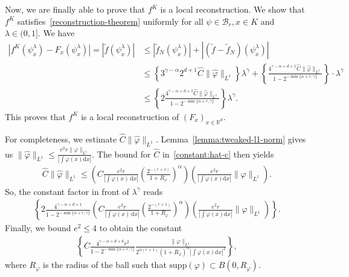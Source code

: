 Now, we are finally able to prove that \(f^K\) is a local reconstruction. We show that \(f^K\) satisfies~\eqref{reconstruction-theorem} uniformly for all \(\psi \in \mathcal{B}_r, x \in K\) and \(\lambda \in (0,1]\). We have
\begin{align*}
    |f^K(\psi^\lambda_x) - F_x(\psi^\lambda_x)| = |\tilde f (\psi^\lambda_x)| 
    &\leq  |\tilde f_N (\psi^\lambda_x)| + |(\tilde f - \tilde f_N) (\psi^\lambda_x)| \\
    &\leq \left \{ 3^{\gamma - \alpha} 2^{d+1} \hat C  \lVert \hat \varphi\rVert_{L^1} \right \} \lambda^\gamma +  \left\{ \frac{ 4^{\gamma - \alpha + d + 1} \hat C \lVert \hat \varphi \rVert_{L^1} }{1-2^{-\min\{\alpha + r, \gamma\}}} \right\}\cdot \lambda^{\gamma}  \\
    &\leq  \left\{2\frac{  4^{\gamma - \alpha + d + 1} \hat C \lVert \hat \varphi \rVert_{L^1}}{1-2^{-\min\{\alpha + r, \gamma\}}} \right\} \lambda^{\gamma}.
\end{align*}
This proves that \(f^K\) is a local reconstruction of \((F_x)_{x \in \mathbb{R}^d}\).

For completeness, we estimate \(\hat C \lVert \hat \varphi \rVert_{L^1}\). Lemma~\ref{lemma:tweaked-l1-norm} gives us \(\lVert \hat \varphi \rVert_{L^1} \leq \frac{e^2 r \lVert \varphi \rVert_{L^1}}{|\int \varphi(x) \mathrm{d}x |} \). The bound for \(\hat C\) in~\eqref{constant:hat-c} then yields 
\begin{align}\label{chatnorml1}
    \hat C \lVert \hat \varphi \rVert_{L^1} \leq \left(C\frac{e^2 r}{|\int \varphi(x)\, \mathrm{d}x|} \left(\frac{2^{-(r+1)}}{1+R_\varphi}\right)^\alpha\right)\left( \frac{e^2 r}{|\int \varphi(x) \mathrm{d}x |} \lVert \varphi \rVert_{L^1}\right).
\end{align}
So, the constant factor in front of \(\lambda^\gamma\) reads 
\begin{align*}
    \left\{2\frac{  4^{\gamma - \alpha + d + 1}}{1-2^{-\min\{\alpha + r, \gamma\}}} \left(C\frac{e^2 r}{|\int \varphi(x)\, \mathrm{d}x|} \left(\frac{2^{-(r+1)}}{1+R_\varphi}\right)^\alpha\right) \left(\frac{e^2 r}{|\int \varphi(x) \mathrm{d}x |} \lVert \varphi \rVert_{L^1}\right) \right\}.
\end{align*}
Finally, we bound \(e^2 \leq 4\) to obtain the constant
\begin{align}\label{constant:rec-gamma-bigger-zero}
    \left\{C\frac{  4^{\gamma - \alpha + d + 6}r^2}{1-2^{-\min\{\alpha + r, \gamma\}}} \frac{\lVert \varphi \rVert_{L^1}}{2^{\alpha(r+1)} (1+R_\varphi)^{\alpha}|\int \varphi(x) \mathrm{d}x |^2}  \right\},
\end{align} 
where \(R_\varphi\) is the radius of the ball such that \(\mathrm{supp}(\varphi) \subset B(0, R_\varphi)\).  


